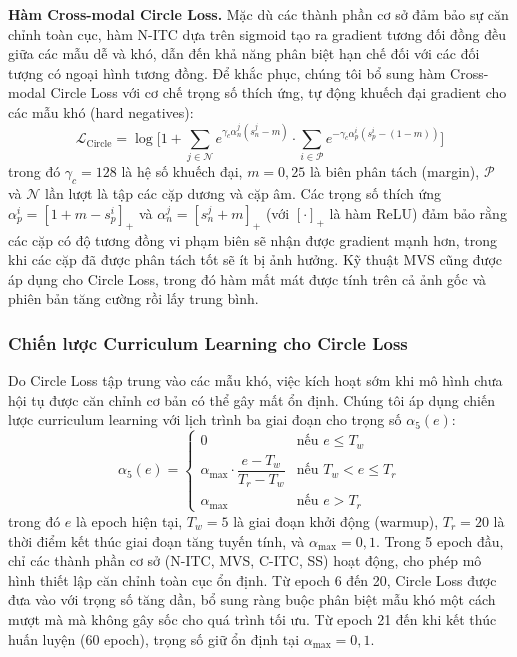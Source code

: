 \documentclass{jstarticle}
\begin{document}
\textbf{Hàm Cross-modal Circle Loss.} Mặc dù các thành phần cơ sở đảm bảo sự căn chỉnh toàn cục, hàm N-ITC dựa trên sigmoid tạo ra gradient tương đối đồng đều giữa các mẫu dễ và khó, dẫn đến khả năng phân biệt hạn chế đối với các đối tượng có ngoại hình tương đồng. Để khắc phục, chúng tôi bổ sung hàm Cross-modal Circle Loss \cite{sun2020circle} với cơ chế trọng số thích ứng, tự động khuếch đại gradient cho các mẫu khó (hard negatives):
\begin{equation}
    \mathcal{L}_{\text{Circle}} = \log \Bigg[ 1 + \sum_{j \in \mathcal{N}} e^{\gamma_c \alpha_n^j (s_n^j - m)} \cdot \sum_{i \in \mathcal{P}} e^{-\gamma_c \alpha_p^i (s_p^i - (1-m))} \Bigg]
\label{eq:circle}
\end{equation}
trong đó $\gamma_c = 128$ là hệ số khuếch đại, $m = 0{,}25$ là biên phân tách (margin), $\mathcal{P}$ và $\mathcal{N}$ lần lượt là tập các cặp dương và cặp âm. Các trọng số thích ứng $\alpha_p^i = [1 + m - s_p^i]_+$ và $\alpha_n^j = [s_n^j + m]_+$ (với $[\cdot]_+$ là hàm ReLU) đảm bảo rằng các cặp có độ tương đồng vi phạm biên sẽ nhận được gradient mạnh hơn, trong khi các cặp đã được phân tách tốt sẽ ít bị ảnh hưởng. Kỹ thuật MVS cũng được áp dụng cho Circle Loss, trong đó hàm mất mát được tính trên cả ảnh gốc và phiên bản tăng cường rồi lấy trung bình.

\subsubsection{Chiến lược Curriculum Learning cho Circle Loss}
Do Circle Loss tập trung vào các mẫu khó, việc kích hoạt sớm khi mô hình chưa hội tụ được căn chỉnh cơ bản có thể gây mất ổn định. Chúng tôi áp dụng chiến lược curriculum learning với lịch trình ba giai đoạn cho trọng số $\alpha_5(e)$:
\begin{equation}
    \alpha_5(e) =
    \begin{cases}
        0 & \text{nếu } e \leq T_w \\[4pt]
        \alpha_{\max} \cdot \dfrac{e - T_w}{T_r - T_w} & \text{nếu } T_w < e \leq T_r \\[4pt]
        \alpha_{\max} & \text{nếu } e > T_r
    \end{cases}
\label{eq:curriculum}
\end{equation}
trong đó $e$ là epoch hiện tại, $T_w = 5$ là giai đoạn khởi động (warmup), $T_r = 20$ là thời điểm kết thúc giai đoạn tăng tuyến tính, và $\alpha_{\max} = 0{,}1$. Trong 5 epoch đầu, chỉ các thành phần cơ sở (N-ITC, MVS, C-ITC, SS) hoạt động, cho phép mô hình thiết lập căn chỉnh toàn cục ổn định. Từ epoch 6 đến 20, Circle Loss được đưa vào với trọng số tăng dần, bổ sung ràng buộc phân biệt mẫu khó một cách mượt mà mà không gây sốc cho quá trình tối ưu. Từ epoch 21 đến khi kết thúc huấn luyện (60 epoch), trọng số giữ ổn định tại $\alpha_{\max} = 0{,}1$.
\end{document}
